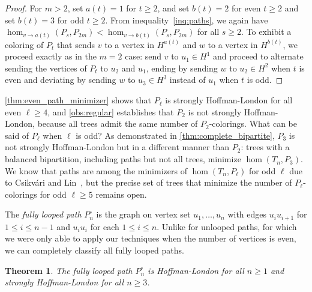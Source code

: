 \documentclass[11pt]{article}
\newtheorem{theorem}{Theorem}[section]
\theoremstyle{definition}
\newcommand{\homclass}[4]{\hom_{#1\to#2}(#3,#4)}
\renewcommand{\loop}{\circ}
\begin{document}
\begin{proof}
For $m>2$, set $a(t)=1$ for $t \ge 2$, and set $b(t)=2$ for even $t \ge 2$ and set $b(t)=3$ for odd $t \ge 2$. From inequality~\eqref{inq:paths}, we again have $\homclass{v}{a(t)}{P_s}{P_{2m}} < \homclass{v}{b(t)}{P_s}{P_{2m}}$ for all $s \ge 2$. To exhibit a coloring of $P_t$ that sends $v$ to a vertex in $H^{a(t)}$ and $w$ to a vertex in $H^{b(t)}$, we proceed exactly as in the $m=2$ case: send $v$ to $u_1 \in H^1$ and proceed to alternate sending the vertices of $P_t$ to $u_2$ and $u_1$, ending by sending $w$ to $u_2\in H^2$ when $t$ is even and deviating by sending $w$ to $u_3 \in H^3$ instead of $u_1$ when $t$ is odd. 
\end{proof}

\cref{thm:even_path_minimizer} shows that $P_\ell$ is strongly Hoffman-London for all even $\ell \ge 4$,  and \cref{obs:regular} establishes that $P_2$ is not strongly Hoffman-London, because all trees admit the same number of $P_2$-colorings. What can be said of $P_\ell$ when $\ell$ is odd? As demonstrated in \cref{thm:complete_bipartite}, $P_3$ is not strongly Hoffman-London but in a different manner than $P_2$: trees with a balanced bipartition, including paths but not all trees, minimize $\hom(T_n,P_3)$. We know that paths are among the minimizers of $\hom(T_n,P_\ell)$ for odd $\ell$ due to Csikv\'ari and Lin~\cite{CsikvariLin2015}, but the precise set of trees that minimize the number of $P_\ell$-colorings for odd $\ell \ge 5$ remains open.

The {\it fully looped path} $P_n^\loop$ is the graph on vertex set $u_1, \ldots, u_n$ with edges $u_iu_{i+1}$ for $1 \le i \le n-1$ and $u_iu_i$ for each $1 \le i \le n$. Unlike for unlooped paths, for which we were only able to apply our techniques when the number of vertices is even, we can completely classify all fully looped paths.

\begin{theorem} \label{prop:looped_path}
The fully looped path $P_n^\loop$ is Hoffman-London for all $n \ge 1$ and strongly Hoffman-London for all $n \ge 3$.
\end{theorem}
\end{document}
